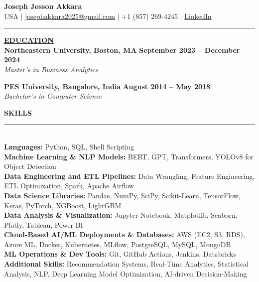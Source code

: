 \documentclass{article}
\begin{document}
\begin{center}
\thispagestyle{empty}

\large \textbf{Joseph Josson Akkara} \\
\normalsize USA $\mid$ \href{mailto:josephakkara2025@gmail.com}{josephakkara2025@gmail.com} $\mid$ +1 (857) 269-4245 $\mid$ \href{https://www.linkedin.com/in/josephjosson/}{LinkedIn} \\
\rule{\textwidth}{1pt}
\end{center}

\noindent \textbf{\underline{EDUCATION}} \\
\noindent \textbf{Northeastern University, Boston, MA} \hfill \textbf{September 2023 -- December 2024} \\
\textit{Master's in Business Analytics}

\vspace{3mm}

\noindent \textbf{PES University, Bangalore, India} \hfill \textbf{August 2014 -- May 2018} \\
\textit{Bachelor's in Computer Science}
\vspace{3mm}

\noindent \textbf{{SKILLS}} \vspace{-8pt} \\
\rule{\linewidth}{0.5pt} \\
\noindent \textbf{Languages:} Python, SQL, Shell Scripting \\
\textbf{Machine Learning \& NLP Models:} BERT, GPT, Transformers, YOLOv8 for Object Detection \\
\textbf{Data Engineering and ETL Pipelines:} Data Wrangling, Feature Engineering, ETL Optimization, Spark, Apache Airflow \\
\textbf{Data Science Libraries:} Pandas, NumPy, SciPy, Scikit-Learn, TensorFlow, Keras, PyTorch, XGBoost, LightGBM \\
\textbf{Data Analysis \& Visualization:} Jupyter Notebook, Matplotlib, Seaborn, Plotly, Tableau, Power BI \\
\textbf{Cloud-Based AI/ML Deployments \& Databases:} AWS (EC2, S3, RDS), Azure ML, Docker, Kubernetes, MLflow, PostgreSQL, MySQL, MongoDB \\
\textbf{ML Operations \& Dev Tools:} Git, GitHub Actions, Jenkins, Databricks \\
\textbf{Additional Skills:} Recommendation Systems, Real-Time Analytics, Statistical Analysis, NLP, Deep Learning Model Optimization, AI-driven Decision-Making
\vspace{3mm}
\end{document}
